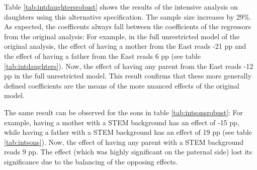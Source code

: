 \documentclass[a4paper, oneside, hyperfootnotes = false]{article}
\begin{document}
{Table \ref{tab:intdaughtersrobust} shows the results of the intensive analysis on daughters using this alternative specification.
The sample size increases by 29\%.
As expected, the coefficents always fall between the coefficients of the regressors from the original analysis:
For example, in the full unrestricted model of the original analysis, the effect of having a mother from the East reads -21 pp and the effect of having a father from the East reads 6 pp (see table \ref{tab:intdaughters}).
Now, the effect of having any parent from the East reads -12 pp in the full unrestricted model.
This result confirms that these more generally defined coefficients are the means of the more nuanced effects of the original model.

The same result can be observed for the sons in table \ref{tab:intsonsrobust}:
For example, having a mother with a STEM background has an effect of -15 pp, while having a father with a STEM background has an effect of 19 pp (see table \ref{tab:intsons}).
Now, the effect of having any parent with a STEM background reads 9 pp.
The effect (which was highly significant on the paternal side) lost its significance due to the balancing of the opposing effects.

\clearpage

}
\end{document}
